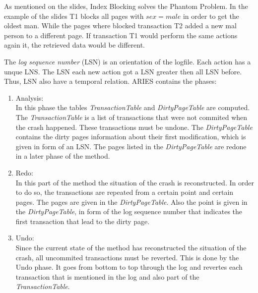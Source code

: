 \begin{exercise}{4}
  \begin{subexercise}
    As mentioned on the slides, Index Blocking solves the Phantom Problem. In the example of the slides T1 blocks all pages with $sex=male$ in order to get the oldest man. While the pages where blocked transaction T2 added a new mal person to a different page. If transaction T1 would perform the same actions again it, the retrieved data would be different.
  \end{subexercise}

  \begin{subexercise}

  The \emph{log sequence number} (LSN) is an orientation of the logfile. Each action has a unque LNS. The LSN each new action got a LSN greater then all LSN before. Thus, LSN also have a temporal relation.
    ARIES contains the phases:
    \begin{enumerate}
      \item Analysis:\\
            In this phase the tables \emph{TransactionTable} and \emph{DirtyPageTable} are computed. The \emph{TransactionTable} is a list of transactions that were not commited when the crash happened. These transactions must be undone. The \emph{DirtyPageTable} contains the dirty pages information about their first modification, which is given in form of an LSN. The pages listed in the \emph{DirtyPageTable} are redone in a later phase of the method.
      \item Redo: \\
            In this part of the method the situation of the crash is reconstructed. In order to do so, the transactions are repeated from a certain point and certain pages. The pages are given in the \emph{DirtyPageTable}. Also the point is given in the \emph{DirtyPageTable}, in form of the log sequence number that indicates the first transaction that lead to the dirty page.
      \item Undo:\\
            Since the current state of the method has reconstructed the situation of the crash, all uncommited transactions must be reverted. This is done by the Undo phase. It goes from bottom to top through the log and revertes each transaction that is mentioned in the log and also part of the \emph{TransactionTable}.
    \end{enumerate}
  \end{subexercise}
\end{exercise}
